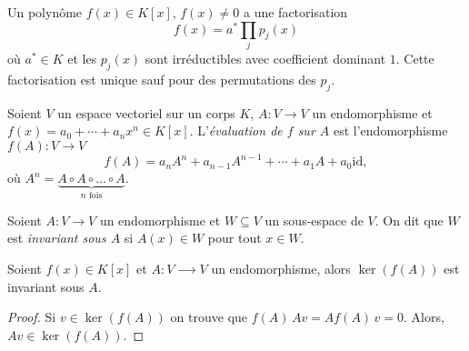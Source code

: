 \begin{theorem}
  \label{thr:40}
  Un polynôme  $f(x) \in K[x]$, $f(x) ≠ 0$  a une factorisation 
  \begin{displaymath}
    f(x) = a^* \prod_j p_j(x)
  \end{displaymath}
  où $a^* \in K$ et les $p_j(x)$ sont irréductibles avec coefficient dominant $1$. Cette factorisation est unique sauf pour des permutations des $p_j$. 
\end{theorem}





\begin{definition}
  \label{def:34}
  Soient $V$ un espace vectoriel sur un corps $K$, $A: V \rightarrow V$ un endomorphisme et $f(x) = a_0+ \cdots + a_n x^n\in K[x]$. L'\emph{évaluation de $f$ sur $A$} est l'endomorphisme $f(A): V \rightarrow V$ 
  \begin{displaymath}
    f(A) = a_n A^n + a_{n-1}A^{n-1}+ \cdots + a_1 A + a_0 \mathrm{id},
  \end{displaymath}
  où $A^n = \underbrace{A \circ A \circ \dots \circ A}_{n \text{ fois}}$.
\end{definition}



\begin{definition}
  \label{def:35}
  Soient $A:V \rightarrow V$ un endomorphisme et $W \subseteq V$ un sous-espace de $V$. On dit que $W$ est \emph{invariant sous $A$} si $A(x) \in W$ pour tout $x \in W$. 
\end{definition}



\begin{lemma}
  \label{lem:20}
  Soient $f(x) ∈ K[x]$ et $A:V ⟶  V$ un endomorphisme,  alors $\ker(f(A))$ est invariant sous $A$. 
\end{lemma}


\begin{proof}
Si $v ∈ \ker(f(A))$ on trouve que $f(A)\,Av = Af(A)\,v = 0$. Alors, $Av ∈ \ker(f(A))$. 
\end{proof}


